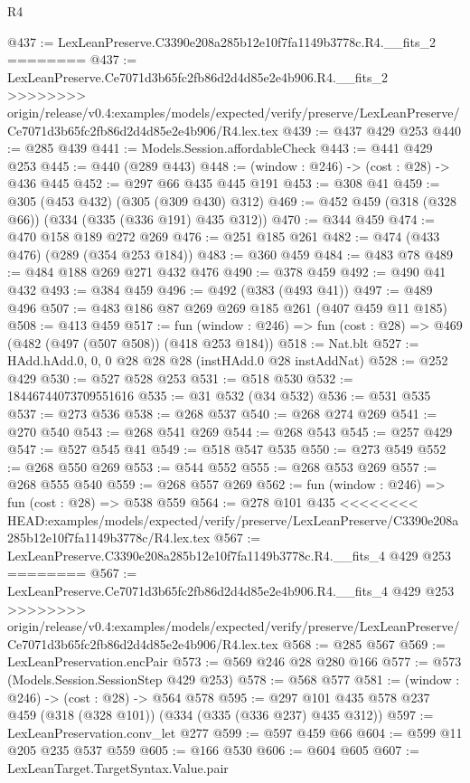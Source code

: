 \begin{lexlean}{R4}
\begin{coremodule}
{{{{{{{{{{{{{{@437 := LexLeanPreserve.C3390e208a285b12e10f7fa1149b3778c.R4.__fits_2
========
@437 := LexLeanPreserve.Ce7071d3b65fc2fb86d2d4d85e2e4b906.R4.__fits_2
>>>>>>>> origin/release/v0.4:examples/models/expected/verify/preserve/LexLeanPreserve/Ce7071d3b65fc2fb86d2d4d85e2e4b906/R4.lex.tex
@439 := @437 @429 @253
@440 := @285 @439
@441 := Models.Session.affordableCheck
@443 := @441 @429 @253
@445 := @440 (@289 @443)
@448 := (window : @246) -> (cost : @28) -> @436 @445
@452 := @297 @66 @435 @445 @191
@453 := @308 @41
@459 := @305 (@453 @432) (@305 (@309 @430) @312)
@469 := @452 @459 (@318 (@328 @66)) (@334 (@335 (@336 @191) @435 @312))
@470 := @344 @459
@474 := @470 @158 @189 @272 @269
@476 := @251 @185 @261
@482 := @474 (@433 @476) (@289 (@354 @253 @184))
@483 := @360 @459
@484 := @483 @78
@489 := @484 @188 @269 @271 @432 @476
@490 := @378 @459
@492 := @490 @41 @432
@493 := @384 @459
@496 := @492 (@383 (@493 @41))
@497 := @489 @496
@507 := @483 @186 @87 @269 @269 @185 @261 (@407 @459 @11 @185)
@508 := @413 @459
@517 := fun (window : @246) => fun (cost : @28) => @469 (@482 (@497 (@507 @508)) (@418 @253 @184))
@518 := Nat.blt
@527 := HAdd.hAdd.{0, 0, 0} @28 @28 @28 (instHAdd.{0} @28 instAddNat)
@528 := @252 @429
@530 := @527 @528 @253
@531 := @518 @530
@532 := 18446744073709551616
@535 := @31 @532 (@34 @532)
@536 := @531 @535
@537 := @273 @536
@538 := @268 @537
@540 := @268 @274 @269
@541 := @270 @540
@543 := @268 @541 @269
@544 := @268 @543
@545 := @257 @429
@547 := @527 @545 @41
@549 := @518 @547 @535
@550 := @273 @549
@552 := @268 @550 @269
@553 := @544 @552
@555 := @268 @553 @269
@557 := @268 @555 @540
@559 := @268 @557 @269
@562 := fun (window : @246) => fun (cost : @28) => @538 @559
@564 := @278 @101 @435
<<<<<<<< HEAD:examples/models/expected/verify/preserve/LexLeanPreserve/C3390e208a285b12e10f7fa1149b3778c/R4.lex.tex
@567 := LexLeanPreserve.C3390e208a285b12e10f7fa1149b3778c.R4.__fits_4 @429 @253
========
@567 := LexLeanPreserve.Ce7071d3b65fc2fb86d2d4d85e2e4b906.R4.__fits_4 @429 @253
>>>>>>>> origin/release/v0.4:examples/models/expected/verify/preserve/LexLeanPreserve/Ce7071d3b65fc2fb86d2d4d85e2e4b906/R4.lex.tex
@568 := @285 @567
@569 := LexLeanPreservation.encPair
@573 := @569 @246 @28 @280 @166
@577 := @573 (Models.Session.SessionStep @429 @253)
@578 := @568 @577
@581 := (window : @246) -> (cost : @28) -> @564 @578
@595 := @297 @101 @435 @578 @237 @459 (@318 (@328 @101)) (@334 (@335 (@336 @237) @435 @312))
@597 := LexLeanPreservation.conv_let @277
@599 := @597 @459 @66
@604 := @599 @11 @205 @235 @537 @559
@605 := @166 @530
@606 := @604 @605
@607 := LexLeanTarget.TargetSyntax.Value.pair
}}}}}}}}}}}}}}
\end{coremodule}
\end{lexlean}
